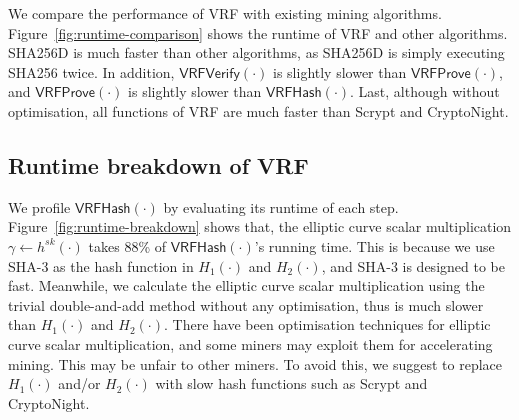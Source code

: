 We compare the performance of VRF with existing mining algorithms.
Figure~\ref{fig:runtime-comparison} shows the runtime of VRF and other algorithms.
SHA256D is much faster than other algorithms, as SHA256D is simply executing SHA256 twice.
In addition, $\mathsf{VRFVerify}(\cdot)$ is slightly slower than $\mathsf{VRFProve}(\cdot)$, and $\mathsf{VRFProve}(\cdot)$ is slightly slower than $\mathsf{VRFHash}(\cdot)$.
Last, although without optimisation, all functions of VRF are much faster than Scrypt and CryptoNight.

\subsection{Runtime breakdown of VRF}

We profile $\mathsf{VRFHash}(\cdot)$ by evaluating its runtime of each step.
Figure~\ref{fig:runtime-breakdown} shows that, the elliptic curve scalar multiplication $\gamma \gets h^{sk}(\cdot)$ takes 88\% of $\mathsf{VRFHash}(\cdot)$'s running time.
This is because we use SHA-3 as the hash function in $H_1(\cdot)$ and $H_2(\cdot)$, and SHA-3 is designed to be fast.
Meanwhile, we calculate the elliptic curve scalar multiplication using the trivial double-and-add method without any optimisation, thus is much slower than $H_1(\cdot)$ and $H_2(\cdot)$.
There have been optimisation techniques for elliptic curve scalar multiplication, and some miners may exploit them for accelerating mining.
This may be unfair to other miners.
To avoid this, we suggest to replace $H_1(\cdot)$ and/or $H_2(\cdot)$ with slow hash functions such as Scrypt and CryptoNight.